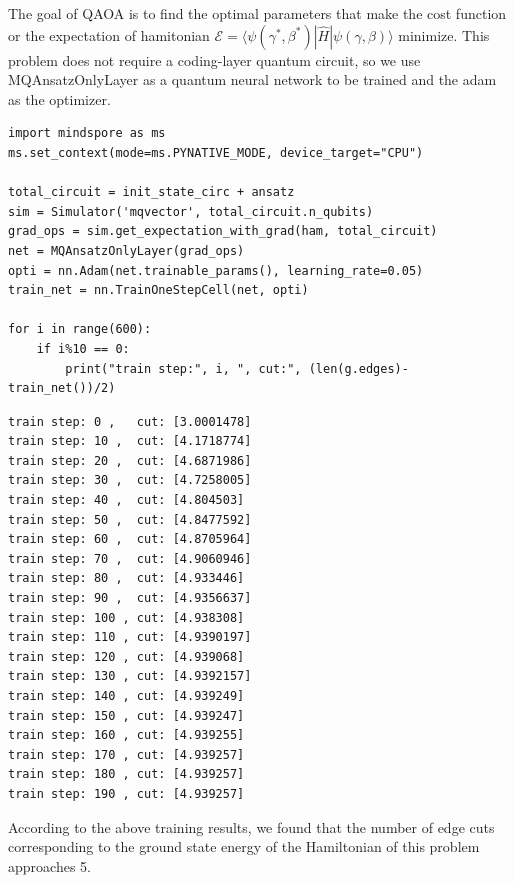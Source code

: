 The goal of QAOA is to find the optimal parameters that make the cost function or the expectation of hamitonian $\mathcal{E}=\langle \psi(\gamma^*, \beta^*)|\hat{H}|\psi(\gamma, \beta)\rangle$ minimize.
This problem does not require a coding-layer quantum circuit, so we use MQAnsatzOnlyLayer as a quantum neural network to be trained and the adam as the optimizer. 
\begin{lstlisting}
import mindspore as ms
ms.set_context(mode=ms.PYNATIVE_MODE, device_target="CPU")

total_circuit = init_state_circ + ansatz
sim = Simulator('mqvector', total_circuit.n_qubits)
grad_ops = sim.get_expectation_with_grad(ham, total_circuit)
net = MQAnsatzOnlyLayer(grad_ops)
opti = nn.Adam(net.trainable_params(), learning_rate=0.05)
train_net = nn.TrainOneStepCell(net, opti)

for i in range(600):
    if i%10 == 0:
        print("train step:", i, ", cut:", (len(g.edges)-train_net())/2)
\end{lstlisting}
\begin{lstlisting}
train step: 0 ,   cut: [3.0001478]
train step: 10 ,  cut: [4.1718774]
train step: 20 ,  cut: [4.6871986]
train step: 30 ,  cut: [4.7258005]
train step: 40 ,  cut: [4.804503]
train step: 50 ,  cut: [4.8477592]
train step: 60 ,  cut: [4.8705964]
train step: 70 ,  cut: [4.9060946]
train step: 80 ,  cut: [4.933446]
train step: 90 ,  cut: [4.9356637]
train step: 100 , cut: [4.938308]
train step: 110 , cut: [4.9390197]
train step: 120 , cut: [4.939068]
train step: 130 , cut: [4.9392157]
train step: 140 , cut: [4.939249]
train step: 150 , cut: [4.939247]
train step: 160 , cut: [4.939255]
train step: 170 , cut: [4.939257]
train step: 180 , cut: [4.939257]
train step: 190 , cut: [4.939257]
\end{lstlisting}

According to the above training results, we found that the number of edge cuts corresponding to the ground state energy of the Hamiltonian of this problem approaches 5.

